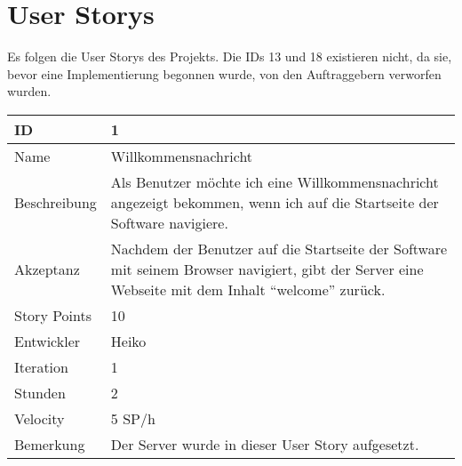 \section{User Storys}
Es folgen die User Storys des Projekts. Die IDs 13 und 18 existieren nicht, da sie, 
bevor eine Implementierung begonnen wurde, von den Auftraggebern verworfen wurden.

\vspace{5em}

\begin{table}[htbp]
    \begin{minipage}{\linewidth}
        \setlength{\tymax}{0.5\linewidth}
        \centering
        \small
        \begin{tabulary}{\textwidth}{|l|p{10cm}|} \hline
            ID   & 1 \\\hline
            Name  & Willkommensnachricht\\\hline
	    Beschreibung& Als Benutzer möchte ich eine Willkommensnachricht angezeigt bekommen, wenn ich auf die Startseite der Software navigiere. \\\hline
	    Akzeptanz &Nachdem der Benutzer auf die Startseite der Software mit seinem Browser navigiert, gibt der Server eine Webseite mit dem Inhalt ``welcome'' zurück.\\\hline
            Story Points&10\\\hline
            Entwickler &Heiko\\\hline
            Iteration &1\\\hline
            Stunden  &2\\\hline
            Velocity &5 SP\slash h\\\hline
	    Bemerkung &Der Server wurde in dieser User Story aufgesetzt.\\\hline
        \end{tabulary}
    \end{minipage}
\end{table}



